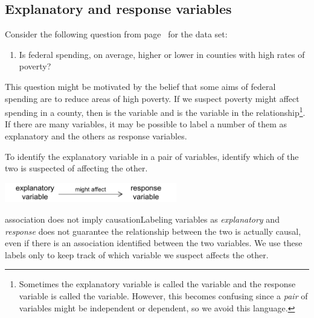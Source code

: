 \subsection{Explanatory and response variables}
\label{explanatoryAndResponse}


Consider the following question from page~\pageref{fedSpendingPovertyQuestion} for the  data set:
\begin{enumerate}
\item[(1)] 
	Is federal spending, on average, higher or lower in counties with high rates of poverty?
\end{enumerate}
This question might be motivated by the belief that some aims of federal spending are to reduce areas of high poverty. If we suspect poverty might affect spending in a county, then  is the  variable and  is the  variable in the relationship\footnote{Sometimes the explanatory variable is called the  variable and the response variable is called the  variable. However, this becomes confusing since a \emph{pair} of variables might be independent or dependent, so we avoid this language.}. If there are many variables, it may be possible to label a number of them as explanatory and the others as response variables.

\begin{tipBox}{
To identify the explanatory variable in a pair of variables, identify which of the two is suspected of affecting the other.

\hspace{10mm}\includegraphics[height=0.34in]{01/figures/expResp/expResp}}
\end{tipBox}

\begin{caution}{association does not imply causation}{Labeling variables as \emph{explanatory} and \emph{response} does not guarantee the relationship between the two is actually causal, even if there is an association identified between the two variables. We use these labels only to keep track of which variable we suspect affects the other.}
\end{caution}

